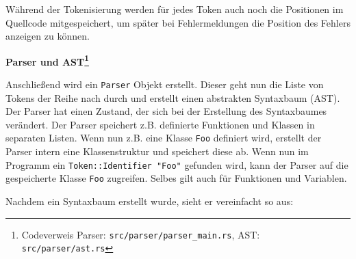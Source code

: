        Während der Tokenisierung werden für jedes Token auch noch die Positionen im Quellcode 
        mitgespeichert, um später bei Fehlermeldungen die Position des Fehlers
        anzeigen zu können.

        \begin{center}
            \textbf{Parser und AST\footnote{Codeverweis Parser: \texttt{src/parser/parser_main.rs}, AST: \texttt{src/parser/ast.rs}}}
        \end{center}

        Anschließend wird ein \texttt{Parser} Objekt erstellt. Dieser geht nun die Liste von Tokens
        der Reihe nach durch und erstellt einen abstrakten Syntaxbaum (AST). Der Parser hat einen Zustand,
        der sich bei der Erstellung des Syntaxbaumes verändert. Der Parser speichert z.B. 
        definierte Funktionen und Klassen in separaten Listen. Wenn nun z.B. eine Klasse \texttt{Foo} definiert wird,
        erstellt der Parser intern eine Klassenstruktur und speichert diese ab.
        Wenn nun im Programm ein \texttt{Token::Identifier "Foo"} gefunden wird, kann der Parser auf
        die gespeicherte Klasse \texttt{Foo} zugreifen.
        Selbes gilt auch für Funktionen und Variablen.

        Nachdem ein Syntaxbaum erstellt wurde, sieht er vereinfacht so aus:

